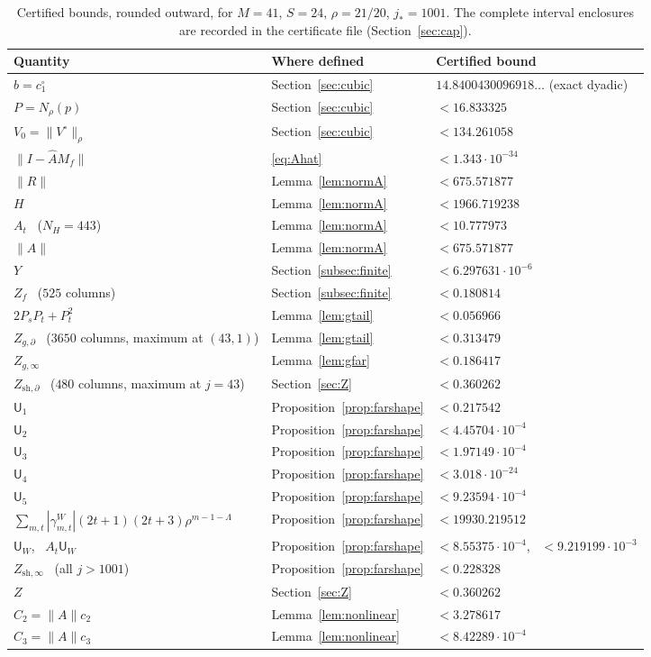 \documentclass[11pt]{amsart}
\theoremstyle{definition}
\theoremstyle{remark}
\numberwithin{equation}{section}
\newcommand{\jst}{j_*}
\newcommand{\sU}{\mathsf{U}}
\newcommand{\nrm}[1]{\lVert #1\rVert}
\begin{document}
\begin{table}[ht]
\centering
\small
\begin{tabular}{@{}lll@{}}
\toprule
Quantity & Where defined & Certified bound\\
\midrule
$b=c_1^\circ$ & Section~\ref{sec:cubic} & $14.8400430096918\ldots$ (exact dyadic)\\
$P=N_\rho(p)$ & Section~\ref{sec:cubic} & $<16.833325$\\
$V_0=\nrm{V^\circ}_\rho$ & Section~\ref{sec:cubic} & $<134.261058$\\
$\nrm{I-\widehat AM_f}$ & \eqref{eq:Ahat} & $<1.343\cdot10^{-34}$\\
$\nrm R$ & Lemma~\ref{lem:normA} & $<675.571877$\\
$H$ & Lemma~\ref{lem:normA} & $<1966.719238$\\
$A_t$ \ ($N_H=443$) & Lemma~\ref{lem:normA} & $<10.777973$\\
$\nrm A$ & Lemma~\ref{lem:normA} & $<675.571877$\\
\midrule
$Y$ & Section~\ref{subsec:finite} & $<6.297631\cdot10^{-6}$\\
$Z_f$ \ ($525$ columns) & Section~\ref{subsec:finite} & $<0.180814$\\
$2P_sP_t+P_t^2$ & Lemma~\ref{lem:gtail} & $<0.056966$\\
$Z_{g,\partial}$ \ ($3650$ columns, maximum at $(43,1)$) & Lemma~\ref{lem:gtail} & $<0.313479$\\
$Z_{g,\infty}$ & Lemma~\ref{lem:gfar} & $<0.186417$\\
$Z_{\mathrm{sh},\partial}$ \ ($480$ columns, maximum at $j=43$) & Section~\ref{sec:Z} & $<0.360262$\\
$\sU_1$ & Proposition~\ref{prop:farshape} & $<0.217542$\\
$\sU_2$ & Proposition~\ref{prop:farshape} & $<4.45704\cdot10^{-4}$\\
$\sU_3$ & Proposition~\ref{prop:farshape} & $<1.97149\cdot10^{-4}$\\
$\sU_4$ & Proposition~\ref{prop:farshape} & $<3.018\cdot10^{-24}$\\
$\sU_5$ & Proposition~\ref{prop:farshape} & $<9.23594\cdot10^{-4}$\\
$\sum_{m,t}|\gamma^W_{m,t}|(2t+1)(2t+3)\rho^{m-1-\Lambda}$ & Proposition~\ref{prop:farshape} & $<19930.219512$\\
$\sU_W$, \ $A_t\sU_W$ & Proposition~\ref{prop:farshape} & $<8.55375\cdot10^{-4}$, \ $<9.219199\cdot10^{-3}$\\
$Z_{\mathrm{sh},\infty}$ \ (all $j>1001$) & Proposition~\ref{prop:farshape} & $<0.228328$\\
$Z$ & Section~\ref{sec:Z} & $<0.360262$\\
$C_2=\nrm Ac_2$ & Lemma~\ref{lem:nonlinear} & $<3.278617$\\
$C_3=\nrm Ac_3$ & Lemma~\ref{lem:nonlinear} & $<8.42289\cdot10^{-4}$\\
\bottomrule
\end{tabular}
\caption{Certified bounds, rounded outward, for $M=41$, $S=24$, $\rho=21/20$, $\jst=1001$. The complete interval enclosures are recorded in the certificate file (Section~\ref{sec:cap}).}
\label{tab:bounds}
\end{table}
\end{document}
